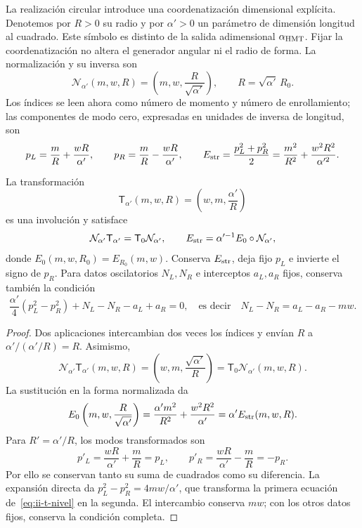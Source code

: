 La realización circular introduce una coordenatización dimensional explícita.
Denotemos por \(R>0\) su radio y por \(\alpha'>0\) un parámetro
de dimensión longitud al cuadrado. Este símbolo es distinto de la salida
adimensional \(\alpha_{\rm HMT}\). Fijar la coordenatización no altera el
generador angular ni el radio de forma. La normalización y su inversa son
\[
 \mathcal N_{\alpha'}(m,w,R)
 =\left(m,w,\frac{R}{\sqrt{\alpha'}}\right),\qquad
 R=\sqrt{\alpha'}\,R_0.
\]
Los índices se leen ahora como número de momento y número de
enrollamiento; las componentes de modo cero, expresadas en unidades de
inversa de longitud, son
\begin{equation}
 p_L=\frac mR+\frac{wR}{\alpha'},\qquad
 p_R=\frac mR-\frac{wR}{\alpha'},\qquad
 E_{\rm str}=\frac{p_L^2+p_R^2}{2}
 =\frac{m^2}{R^2}+\frac{w^2R^2}{\alpha'^2}.
 \label{eq:ii-t-quirales}
\end{equation}

\begin{theorem}
\label{thm:ii-t-cuerda}
La transformación
\[
 \mathsf T_{\alpha'}(m,w,R)=\left(w,m,\frac{\alpha'}R\right)
\]
es una involución y satisface
\begin{equation}
 \mathcal N_{\alpha'}\mathsf T_{\alpha'}
 =\mathsf T_0\mathcal N_{\alpha'},\qquad
 E_{\rm str}=\alpha'^{-1}E_0\circ\mathcal N_{\alpha'},
 \label{eq:ii-t-normalizacion}
\end{equation}
donde \(E_0(m,w,R_0)=E_{R_0}(m,w)\). Conserva \(E_{\rm str}\),
deja fijo \(p_L\) e invierte el signo de \(p_R\). Para datos
oscilatorios \(N_L,N_R\) e interceptos \(a_L,a_R\) fijos,
conserva también la condición
\begin{equation}
 \frac{\alpha'}4(p_L^2-p_R^2)+N_L-N_R-a_L+a_R=0,
 \quad\text{es decir}\quad
 N_L-N_R=a_L-a_R-mw.
 \label{eq:ii-t-nivel}
\end{equation}
\end{theorem}

\begin{proof}
Dos aplicaciones intercambian dos veces los índices y envían
\(R\) a \(\alpha'/(\alpha'/R)=R\). Asimismo,
\[
 \mathcal N_{\alpha'}\mathsf T_{\alpha'}(m,w,R)
 =\left(w,m,\frac{\sqrt{\alpha'}}R\right)
 =\mathsf T_0\mathcal N_{\alpha'}(m,w,R).
\]
La sustitución en la forma normalizada da
\[
 E_0\left(m,w,\frac R{\sqrt{\alpha'}}\right)
 =\frac{\alpha'm^2}{R^2}+\frac{w^2R^2}{\alpha'}
 =\alpha'E_{\rm str}(m,w,R).
\]
Para \(R'=\alpha'/R\), los modos transformados son
\[
 p'_L=\frac{wR}{\alpha'}+\frac mR=p_L,\qquad
 p'_R=\frac{wR}{\alpha'}-\frac mR=-p_R.
\]
Por ello se conservan tanto su suma de cuadrados como su diferencia.
La expansión directa da \(p_L^2-p_R^2=4mw/\alpha'\), que
transforma la primera ecuación de~\eqref{eq:ii-t-nivel} en la segunda.
El intercambio conserva \(mw\); con los otros datos fijos, conserva
la condición completa.
\end{proof}

